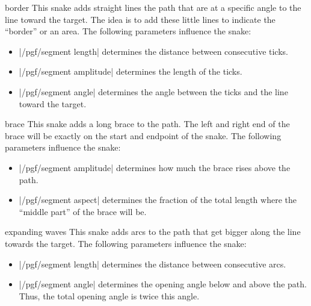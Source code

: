 \begin{decoration}{border}
  This snake adds straight lines the path that are at a specific angle
  to the line toward the target. The idea is to add these little lines
  to indicate the ``border'' or an area. The following parameters
  influence the snake:  
  \begin{itemize}
  \item |/pgf/segment length|
    determines the distance between consecutive ticks.
  \item |/pgf/segment amplitude|
    determines the length of the ticks.
  \item |/pgf/segment angle|
    determines the angle between the ticks and the line toward the
    target. 
  \end{itemize}
\begin{codeexample}[]
\end{codeexample}
\end{decoration}


\begin{decoration}{brace}
  This snake adds a long brace to the path. The left and right end of
  the brace will be exactly on the start and endpoint of the
  snake. The following parameters influence the snake:  
  \begin{itemize}
  \item |/pgf/segment amplitude|
    determines how much the brace rises above the path.
  \item |/pgf/segment aspect|
    determines the fraction of the total length where the ``middle
    part'' of the brace will be.  
  \end{itemize}
\begin{codeexample}[]
\end{codeexample}
\end{decoration}


\begin{decoration}{expanding waves}
  This snake adds arcs to the path that get bigger along the line
  towards the target. The following parameters influence the snake:
  \begin{itemize}
  \item |/pgf/segment length|
    determines the distance between consecutive arcs.
  \item |/pgf/segment angle|
    determines the opening angle below and above the path. Thus, the
    total opening angle is twice this angle.
  \end{itemize}
\begin{codeexample}[]
\end{codeexample}
\end{decoration}




